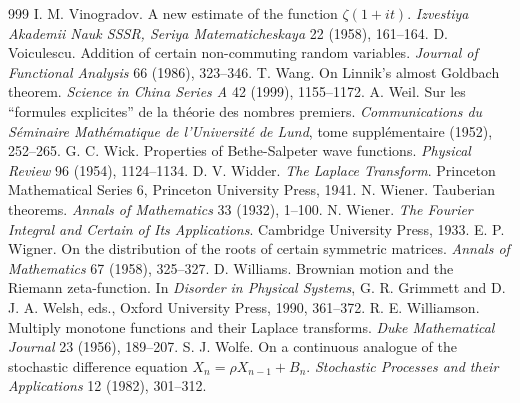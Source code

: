 \begin{thebibliography}{999}
 I. M. Vinogradov. A new estimate of the function $\zeta(1+it)$. \emph{Izvestiya Akademii Nauk SSSR, Seriya Matematicheskaya} 22 (1958), 161--164.
 D. Voiculescu. Addition of certain non-commuting random variables. \emph{Journal of Functional Analysis} 66 (1986), 323--346.
 T. Wang. On Linnik's almost Goldbach theorem. \emph{Science in China Series A} 42 (1999), 1155--1172.
 A. Weil. Sur les ``formules explicites'' de la th\'eorie des nombres premiers. \emph{Communications du S\'eminaire Math\'ematique de l'Universit\'e de Lund}, tome suppl\'ementaire (1952), 252--265.
 G. C. Wick. Properties of Bethe-Salpeter wave functions. \emph{Physical Review} 96 (1954), 1124--1134.
 D. V. Widder. \emph{The Laplace Transform}. Princeton Mathematical Series 6, Princeton University Press, 1941.
 N. Wiener. Tauberian theorems. \emph{Annals of Mathematics} 33 (1932), 1--100.
 N. Wiener. \emph{The Fourier Integral and Certain of Its Applications}. Cambridge University Press, 1933.
 E. P. Wigner. On the distribution of the roots of certain symmetric matrices. \emph{Annals of Mathematics} 67 (1958), 325--327.
 D. Williams. Brownian motion and the Riemann zeta-function. In \emph{Disorder in Physical Systems}, G. R. Grimmett and D. J. A. Welsh, eds., Oxford University Press, 1990, 361--372.
 R. E. Williamson. Multiply monotone functions and their Laplace transforms. \emph{Duke Mathematical Journal} 23 (1956), 189--207.
 S. J. Wolfe. On a continuous analogue of the stochastic difference equation $X_n=\rho X_{n-1}+B_n$. \emph{Stochastic Processes and their Applications} 12 (1982), 301--312.

\end{thebibliography}
